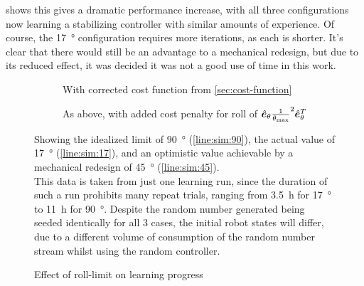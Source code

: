 \documentclass[main.tex]{subfiles}
\begin{document}
	 shows this gives a dramatic performance increase, with all three configurations now learning a stabilizing controller with similar amounts of experience.
	Of course, the \SI{17}{\degree} configuration requires more iterations, as each is shorter.
	It's clear that there would still be an advantage to a mechanical redesign, but due to its reduced effect, it was decided it was not a good use of time in this work.

	\begin{figure}
		\begin{subfigure}[t]{\linewidth}
			\begin{minipage}{0.5\linewidth - 2em}
				
			\end{minipage}\hfill
			\begin{minipage}{0.5\linewidth - 2em}
				
			\end{minipage}
			\caption{With corrected cost function from \cref{sec:cost-function}}
			\label{fig:roll:progress:prev}
		\end{subfigure}
		\par\bigskip
		\begin{subfigure}[t]{\linewidth}
			\begin{minipage}{0.5\linewidth - 2em}
				
			\end{minipage}\hfill
			\begin{minipage}{0.5\linewidth - 2em}
				
			\end{minipage}
			\caption{As above, with added cost penalty for roll of $\hat{\bm{e}}_{\theta}\frac{1}{\theta_{\mathrm{max}}}^2\hat{\bm{e}}_{\theta}^T$}
			\label{fig:roll:progress:fixed}
		\end{subfigure}
		\caption{Effect of roll-limit on learning progress}
		\label{fig:roll:progress}
		\medskip
		\small
		Showing the idealized limit of \SI{90}{\degree} (\ref{line:sim:90}), the actual value of \SI{17}{\degree} (\ref{line:sim:17}), and an optimistic value achievable by a mechanical redesign of \SI{45}{\degree} (\ref{line:sim:45}).
		\medskip\\
		This data is taken from just one learning run, since the duration of such a run prohibits many repeat trials, ranging from \SI{3.5}{\hour} for \SI{17}{\degree} to \SI{11}{\hour} for \SI{90}{\degree}.
		Despite the random number generated being seeded identically for all 3 cases, the initial robot states will differ, due to a different volume of consumption of the random number stream whilst using the random controller.
	\end{figure}

	\bib
\end{document}
